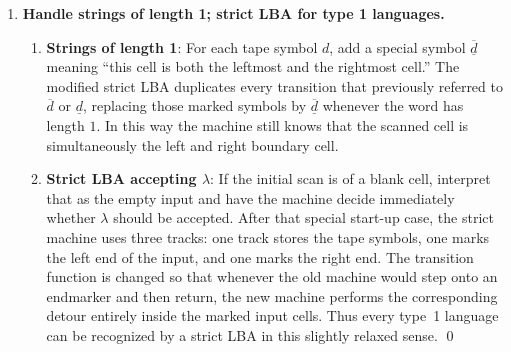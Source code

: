 \begin{enumerate}[{11.}1. ]
\begin{enumerate}
In other words, the strict machine does \emph{not} reject when the old machine
would have stepped onto a delimiter; instead, it simulates the unique
delimiter-scan-and-return behavior without ever leaving the marked end cells.

\item \textbf{Proof of equivalence} (for $|x|\geq 2$): By induction on the number of steps:
- Every ordinary move of $M$ is matched by the corresponding move of $M'$ while
preserving the marked end cells.
- Every two-step excursion of $M$ from an end cell onto a delimiter and back is
replaced by the corresponding unique boundary detour in $M'$.
- Hence the two machines visit corresponding configurations inside the word and
accept exactly the same words.

So for every input of length at least $2$, the strict three-track machine
accepts exactly when the original LBA does. \qed
\end{enumerate}

\item \textbf{Handle strings of length 1; strict LBA for type 1 languages.}

\begin{enumerate}
\item \textbf{Strings of length 1}: For each tape symbol $d$, add a special symbol
$\overline{\underline{d}}$ meaning ``this cell is both the leftmost and the
rightmost cell.'' The modified strict LBA duplicates every transition that
previously referred to $\overline{d}$ or $\underline{d}$, replacing those marked
symbols by $\overline{\underline{d}}$ whenever the word has length $1$. In this
way the machine still knows that the scanned cell is simultaneously the left and
right boundary cell.

\item \textbf{Strict LBA accepting $\lambda$}: If the initial scan is of a blank
cell, interpret that as the empty input and have the machine decide immediately
whether $\lambda$ should be accepted. After that special start-up case, the
strict machine uses three tracks: one track stores the tape symbols, one marks
the left end of the input, and one marks the right end. The transition function
is changed so that whenever the old machine would step onto an endmarker and
then return, the new machine performs the corresponding detour entirely inside
the marked input cells. Thus every type~1
language can be recognized by a
strict LBA in this slightly relaxed sense. \qed
\end{enumerate}


\end{enumerate}
